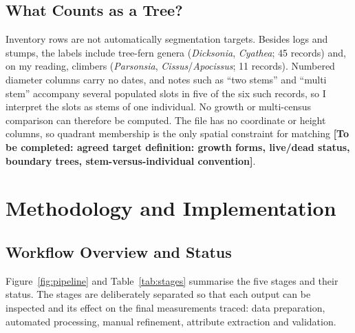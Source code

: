 \documentclass[runningheads]{llncs}
\newcommand{\todo}[1]{\textbf{[To be completed: #1]}}
\begin{document}
\subsection{What Counts as a Tree?}\label{sec:target}
Inventory rows are not automatically segmentation targets. Besides logs and stumps, the labels include tree-fern genera (\textit{Dicksonia}, \textit{Cyathea}; 45 records) and, on my reading, climbers (\textit{Parsonsia}, \textit{Cissus}/\textit{Apocissus}; 11 records). Numbered diameter columns carry no dates, and notes such as ``two stems'' and ``multi stem'' accompany several populated slots in five of the six such records, so I interpret the slots as stems of one individual. No growth or multi-census comparison can therefore be computed. The file has no coordinate or height columns, so quadrant membership is the only spatial constraint for matching \todo{agreed target definition: growth forms, live/dead status, boundary trees, stem-versus-individual convention}.

\section{Methodology and Implementation}\label{sec:method}

\subsection{Workflow Overview and Status}
Figure~\ref{fig:pipeline} and Table~\ref{tab:stages} summarise the five stages and their status. The stages are deliberately separated so that each output can be inspected and its effect on the final measurements traced: data preparation, automated processing, manual refinement, attribute extraction and validation.
\end{document}
